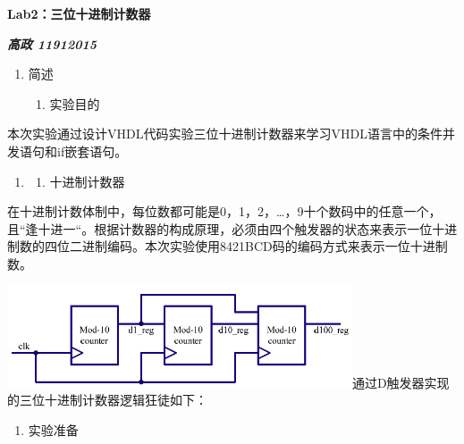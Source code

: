 \documentclass{article} %
\begin{document}


\noindent

\noindent

\noindent

\noindent

\noindent \textbf{Lab2：三位十进制计数器}

\noindent \textbf{\textit{高政 11912015}}

\begin{enumerate}
    \item \textbf{\textit{ }}简述

          \begin{enumerate}
              \item  实验目的
          \end{enumerate}
\end{enumerate}

本次实验通过设计VHDL代码实验三位十进制计数器来学习VHDL语言中的条件并发语句和if嵌套语句。

\begin{enumerate}
    \item \begin{enumerate}
              \item  十进制计数器
          \end{enumerate}
\end{enumerate}

在十进制计数体制中，每位数都可能是0，1，2，{\dots}，9十个数码中的任意一个，且``逢十进一``。根据计数器的构成原理，必须由四个触发器的状态来表示一位十进制数的四位二进制编码。本次实验使用8421BCD码的编码方式来表示一位十进制数。

\includegraphics*[width=4.02in, height=1.19in]{image1}通过D触发器实现的三位十进制计数器逻辑狂徒如下：

\begin{enumerate}
    \item  实验准备
\end{enumerate}
\end{document}

